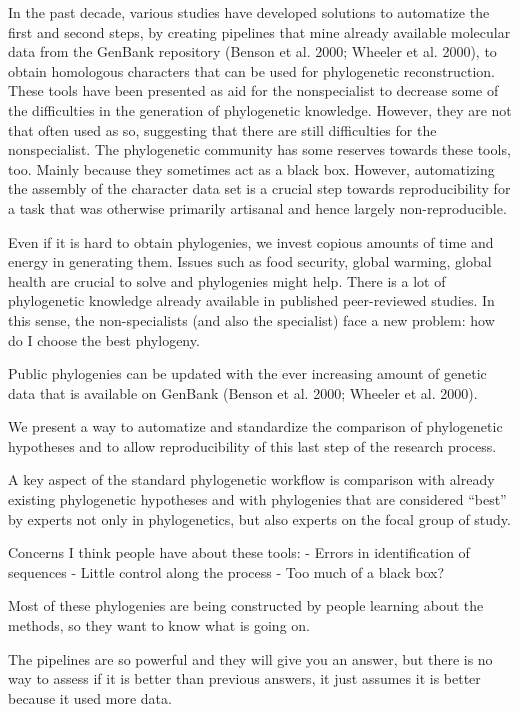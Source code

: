 \documentclass[draft]{ametsoc}
\begin{document}
In the past decade, various studies have developed solutions to
automatize the first and second steps, by creating pipelines that mine
already available molecular data from the GenBank repository (Benson et
al. 2000; Wheeler et al. 2000), to obtain homologous characters that can
be used for phylogenetic reconstruction. These tools have been presented
as aid for the nonspecialist to decrease some of the difficulties in the
generation of phylogenetic knowledge. However, they are not that often
used as so, suggesting that there are still difficulties for the
nonspecialist. The phylogenetic community has some reserves towards
these tools, too. Mainly because they sometimes act as a black box.
However, automatizing the assembly of the character data set is a
crucial step towards reproducibility for a task that was otherwise
primarily artisanal and hence largely non-reproducible.

Even if it is hard to obtain phylogenies, we invest copious amounts of
time and energy in generating them. Issues such as food security, global
warming, global health are crucial to solve and phylogenies might help.
There is a lot of phylogenetic knowledge already available in published
peer-reviewed studies. In this sense, the non-specialists (and also the
specialist) face a new problem: how do I choose the best phylogeny.

Public phylogenies can be updated with the ever increasing amount of
genetic data that is available on GenBank (Benson et al. 2000; Wheeler
et al. 2000).

We present a way to automatize and standardize the comparison of
phylogenetic hypotheses and to allow reproducibility of this last step
of the research process.

A key aspect of the standard phylogenetic workflow is comparison with
already existing phylogenetic hypotheses and with phylogenies that are
considered ``best'' by experts not only in phylogenetics, but also
experts on the focal group of study.

Concerns I think people have about these tools: - Errors in
identification of sequences - Little control along the process - Too
much of a black box?

Most of these phylogenies are being constructed by people learning about
the methods, so they want to know what is going on.

The pipelines are so powerful and they will give you an answer, but
there is no way to assess if it is better than previous answers, it just
assumes it is better because it used more data.
\end{document}
